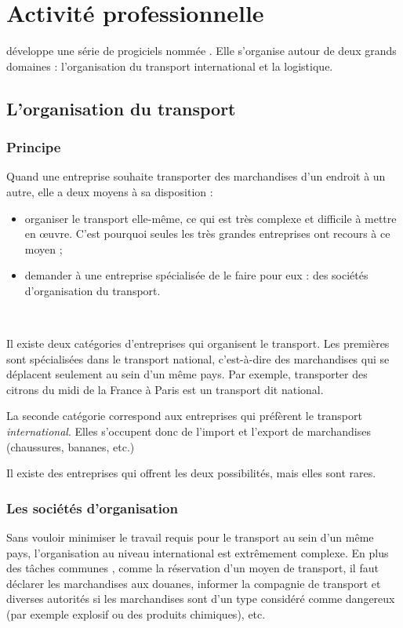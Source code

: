 \chapter{Activité professionnelle}
\solulog{} développe une série de progiciels nommée \integrale. Elle s'organise autour de deux grands domaines : l'organisation du transport international et la logistique.
	
\section{L'organisation du transport}
\subsection{Principe}
Quand une entreprise souhaite transporter des marchandises d'un endroit à un autre, elle a deux moyens à sa disposition :
\begin{itemize}
	\item organiser le transport elle-même, ce qui est très complexe et difficile à mettre en \oe uvre. C'est pourquoi seules les très grandes entreprises ont recours à ce moyen ;
	\item demander à une entreprise spécialisée de le faire pour eux : des sociétés d'organisation du transport.
\end{itemize}
	
~	
	
Il existe deux catégories d'entreprises qui organisent le transport. Les premières sont spécialisées dans le transport national, c'est-à-dire des marchandises qui se déplacent seulement au sein d'un même pays. Par exemple, transporter des citrons du midi de la France à Paris est un transport dit national.

La seconde catégorie correspond aux entreprises qui préfèrent le transport \emph{international}. Elles s'occupent donc de l'import et l'export de marchandises (chaussures, bananes, etc.)

Il existe des entreprises qui offrent les deux possibilités, mais elles sont rares.
	
		
\subsection{Les sociétés d'organisation}
Sans vouloir minimiser le travail requis pour le transport au sein d'un même pays, l'organisation au niveau international est extrêmement complexe. En plus des tâches \og communes \fg {}, comme la réservation d'un moyen de transport, il faut déclarer les marchandises aux douanes, informer la compagnie de transport et diverses autorités si les marchandises sont d'un type considéré comme dangereux (par exemple explosif ou des produits chimiques), etc.

